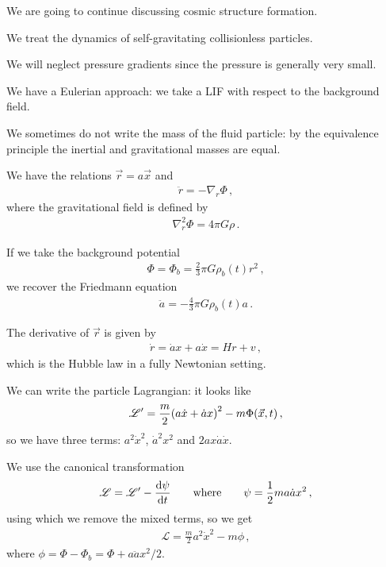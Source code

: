 \documentclass[main.tex]{subfiles}
\begin{document}

We are going to continue discussing cosmic structure formation.

We treat the dynamics of self-gravitating collisionless particles. 

We will neglect pressure gradients since the pressure is generally very small. 

We have a Eulerian approach: we take a LIF with respect to the background field. 

We sometimes do not write the mass of the fluid particle: by the equivalence principle the inertial and gravitational masses are equal.

We have the relations \(\vec{r} = a \vec{x}\) and 
%
\begin{align}
\ddot{r} = - \nabla_{r} \Phi 
\,,
\end{align}
%
where the gravitational field is defined by 
%
\begin{align}
\nabla^2_{r} \Phi  = 4 \pi G \rho 
\,.
\end{align}

If we take the background potential 
%
\begin{align}
\Phi = \Phi_{b} = \frac{2}{3} \pi G \rho_{b} (t) r^2
\,,
\end{align}
%
we recover the Friedmann equation 
%
\begin{align}
\ddot{a} = - \frac{4}{3} \pi G \rho_{b} (t) a
\,.
\end{align}

The derivative of \(\vec{r}\) is given by 
%
\begin{align}
\dot{r} = \dot{a} x + a \dot{x} = Hr + v
\,,
\end{align}
%
which is the Hubble law in a fully Newtonian setting. 

We can write the particle Lagrangian: it looks like 
%
\begin{align}
\mathscr{L}' = \frac{m}{2} \qty(a \dot{x} + \dot{a} x)^2 - m \Phi (\vec{x}, t)
\,,
\end{align}
%
so we have three terms: \(a^2 \dot{x}^2\), \(\dot{a}^2 x^2 \) and \(2 a x \dot{a} \dot{x}\).

We use the canonical transformation 
%
\begin{align}
\mathscr{L} = \mathscr{L}' - \dv{\psi }{t}
\qquad \text{where} \qquad
\psi = \frac{1}{2} m a \dot{a} x^2
\,,
\end{align}
%
using which we remove the mixed terms, so we get 
%
\begin{align}
\mathscr{L} = \frac{m}{2} a^2 \dot{x}^2 - m \phi 
\,,
\end{align}
%
where \(\phi = \Phi - \Phi_{b} = \Phi + a \ddot{a} x^2 / 2\).
\end{document}
